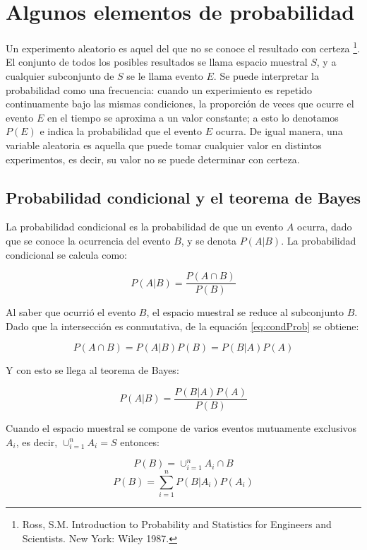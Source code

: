 \documentclass[a4paper, 11pt, oneside]{report}
\begin{document}
\section{Algunos elementos de probabilidad}

Un experimento aleatorio es aquel del que no se conoce el resultado con certeza \footnote{Ross, S.M. Introduction to Probability and Statistics for Engineers and Scientists. New York: Wiley 1987.}. El conjunto de todos los posibles resultados se llama espacio muestral $S$, y a cualquier subconjunto de $S$ se le llama evento $E$. Se puede interpretar la probabilidad como una frecuencia: cuando un experimiento es repetido continuamente bajo las mismas condiciones, la proporción de veces que ocurre el evento $E$ en el tiempo se aproxima a un valor constante; a esto lo denotamos $P(E)$ e indica la probabilidad que el evento $E$ ocurra. De igual manera, una variable aleatoria es aquella que puede tomar cualquier valor en distintos experimentos, es decir, su valor no se puede determinar con certeza.

\subsection{Probabilidad condicional y el teorema de Bayes}

La probabilidad condicional es la probabilidad de que un evento $A$ ocurra, dado que se conoce la ocurrencia del evento $B$, y se denota $P(A|B)$. La probabilidad condicional se calcula como:

	\begin{equation}\label{eq:condProb}
		P(A|B) = \frac{P(A \cap B)}{P(B)}
	\end{equation}

Al saber que ocurrió el evento $B$, el espacio muestral se reduce al subconjunto $B$. Dado que la intersección es conmutativa, de la equación \ref{eq:condProb} se obtiene:

\[P(A \cap B) = P(A|B)P(B) = P(B|A)P(A)\]

Y con esto se llega al teorema de Bayes:

	\begin{equation}\label{eq:bayes}
		P(A|B) = \frac{P(B|A)P(A)}{P(B)}
	\end{equation}

Cuando el espacio muestral se compone de varios eventos mutuamente exclusivos $A_i$, es decir, $\cup_{i=1}^{n} A_i = S$ entonces:

\[P(B)=\cup_{i=1}^{n} {A_i \cap B}\]
	\begin{equation}\label{eq:bayesDenominator}
		P(B) = \sum_{i=1}^{n}{P(B|A_i)P(A_i)}
	\end{equation}
\end{document}
